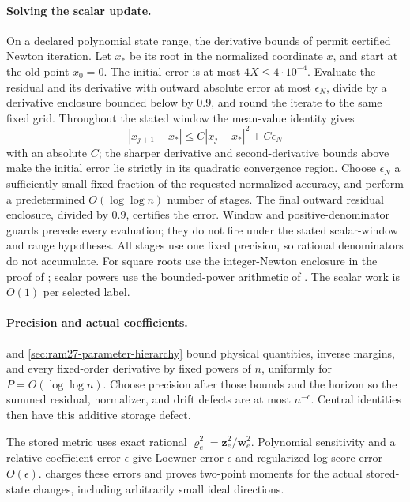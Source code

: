 \documentclass[11pt]{article}
\theoremstyle{remark}
\newcommand{\ww}{\mathbf w}
\newcommand{\zz}{\mathbf z}
\newcommand{\vvr}{\boldsymbol{\varrho}}
\renewcommand{\O}{\ddot{O}}
\begin{document}
\paragraph{Solving the scalar update.}
On a declared polynomial state range, the derivative bounds of
 permit certified Newton iteration.
Let $x_*$ be its root in the normalized coordinate $x$, and start at the old
point $x_0=0$.
The initial error is at most $4X\le4\cdot10^{-4}$.
Evaluate the residual and its derivative with outward absolute error at most
$\epsilon_N$, divide by a derivative enclosure bounded below by $0.9$, and round
the iterate to the same fixed grid.
Throughout the stated window the mean-value identity gives
\[
 |x_{j+1}-x_*|\le C|x_j-x_*|^2+C\epsilon_N
\]
with an absolute $C$; the sharper derivative and second-derivative bounds above
make the initial error lie strictly in its quadratic convergence region.
Choose $\epsilon_N$ a sufficiently small fixed fraction of the requested
normalized accuracy, and perform a predetermined $O(\log\log n)$ number of
stages.
The final outward residual enclosure, divided by $0.9$, certifies the error.
Window and positive-denominator guards precede every evaluation; they do not
fire under the stated scalar-window and range hypotheses.
All stages use one fixed precision, so rational denominators do not accumulate.
For square roots use the integer-Newton enclosure in the proof of
; scalar powers use the bounded-power
arithmetic of .
The scalar work is $\O(1)$ per selected label.

\paragraph{Precision and actual coefficients.}
 and \ref{sec:ram27-parameter-hierarchy} bound
physical quantities, inverse margins, and every fixed-order derivative by fixed
powers of $n$, uniformly for $P=O(\log\log n)$.
Choose precision after those bounds and the horizon so the summed residual,
normalizer, and drift defects are at most $n^{-c}$.
Central identities then have this additive storage defect.

The stored metric uses exact rational $\vvr_e^2=\zz_e^2/\ww_e^2$.
Polynomial sensitivity and a relative coefficient error $\epsilon$ give Loewner
error $\epsilon$ and regularized-log-score error $O(\epsilon)$.
 charges these errors and proves two-point
moments for the actual stored-state changes, including arbitrarily small ideal
directions.
\end{document}
